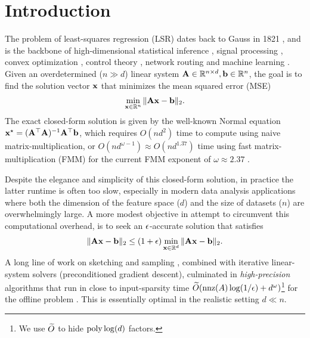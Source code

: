 \section{Introduction}
\label{sec:intro}
The problem of least-squares regression (LSR)  dates back to Gauss in 1821 \cite{GaussLS}, and is the backbone 
of high-dimensional statistical inference \cite{HFT_book_01}, signal processing \cite{rg75},  
convex optimization \cite{b15}, control theory \cite{k90}, 
network routing \cite{ls14,m13} and machine learning \cite{cortes1995support}. 
Given an overdetermined ($n\gg d$) linear system $\mathbf{A} \in \mathbb{R}^{n \times d}, \mathbf{b} \in \mathbb{R}^n $, 
the goal is to find the solution vector $\mathbf{x}$ that minimizes the mean squared error (MSE)
\begin{align} \label{eq_LS_reg} 
\min_{\mathbf{x}\in \mathbb{R}^n} \| \mathbf{A}\mathbf{x} - \mathbf{b} \|_2.
\end{align}
The exact closed-form solution is given by the well-known Normal equation
$\mathbf{x}^\star = (\mathbf{A}^\top \mathbf{A})^{-1}\mathbf{A}^\top \mathbf{b}$, 
which requires $O(nd^2)$ time to compute using naive matrix-multiplication, or $O(nd^{\omega-1}) \approx O(n d^{1.37})$ time using fast matrix-multiplication (FMM) \cite{s69} for the current FMM exponent of $\omega \approx 2.37$ \cite{le14, aw21}.

Despite the elegance and simplicity of this closed-form solution, in practice the latter runtime is often too slow, especially in modern data analysis applications where both the dimension of the 
feature space ($d$) and the size of datasets ($n$) are overwhelmingly large. 
A more modest objective in attempt to circumvent this computational overhead, is to seek an $\epsilon$-accurate solution that satisfies 
\begin{align} \label{eq_APX_LS_solution} 
\|\mathbf{A} \mathbf{x}- \mathbf{b}\|_2 \leq (1+\epsilon) \min_{\mathbf{x} \in \mathbb{R}^d} \|\mathbf{A} \mathbf{x} - \mathbf{b} \|_2 .
\end{align} 
A long line of work on sketching \cite{cw17} and sampling \cite{clmmps15}, combined with iterative linear-system solvers (preconditioned gradient descent), culminated in \emph{high-precision} algorithms that run in close to input-sparsity time 
$\widetilde{O}(\operatorname{nnz}(A)\log(1/\epsilon)+ d^{\omega})$\footnote{We use $\widetilde{O}$ to hide $\operatorname{poly} \log(d)$ factors.} 
for the offline problem \cite{s06, cw17, nn13, cherapanamjeri2023optimal}.
This is essentially optimal in the realistic setting $d\ll n$. 

